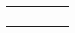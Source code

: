 \newpage 
\section*{}
\begin{table}[H]
	\centering
	\begin{tabular}{p{4cm}|C{3cm}|C{3cm}|R{2.5cm}|R{2cm}}
		
		 & & & & \\
		
		
		\emph{}	 & & & & \\
		\hline
		
		\emph{}& & & & \\
		\hline
		
		\emph{}& & & & \\
		\hline
		
	\end{tabular}
	
\end{table}


\clearpage
